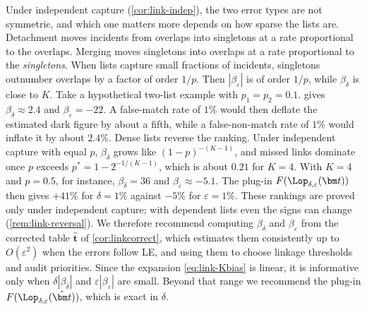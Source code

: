 \begin{remark}\label{rem:link-reading}
Under independent capture (\cref{cor:link-indep}), the two error types are not symmetric, and which one matters more depends on how sparse the lists are. Detachment moves incidents from overlaps into singletons at a rate proportional to the overlaps. Merging moves singletons into overlaps at a rate proportional to the \emph{singletons}. When lists capture small fractions of incidents, singletons outnumber overlaps by a factor of order $1/p$. Then $|\beta_\varepsilon|$ is of order $1/p$, while $\beta_\delta$ is close to $K$. Take a hypothetical two-list example with $p_1=p_2=0.1$.  gives $\beta_\delta\approx2.4$ and $\beta_\varepsilon=-22$. A false-match rate of $1\%$ would then deflate the estimated dark figure by about a fifth, while a false-non-match rate of $1\%$ would inflate it by about $2.4\%$. Dense lists reverse the ranking. Under independent capture with equal $p$, $\beta_\delta$ grows like $(1-p)^{-(K-1)}$, and missed links dominate once $p$ exceeds $p^\ast=1-2^{-1/(K-1)}$, which is about $0.21$ for $K=4$. With $K=4$ and $p=0.5$, for instance, $\beta_\delta=36$ and $\beta_\varepsilon\approx-5.1$. The plug-in $F(\Lop_{\delta,\varepsilon}(\bm t))$ then gives $+41\%$ for $\delta=1\%$ against $-5\%$ for $\varepsilon=1\%$. These rankings are proved only under independent capture; with dependent lists even the signs can change (\cref{rem:link-reversal}). We therefore recommend computing $\beta_\delta$ and $\beta_\varepsilon$ from the corrected table $\hat{\bm t}$ of \cref{cor:linkcorrect}, which estimates them consistently up to $O(\varepsilon^2)$ when the errors follow LE, and using them to choose linkage thresholds and audit priorities. Since the expansion \eqref{eq:link-Kbias} is linear, it is informative only when $\delta|\beta_\delta|$ and $\varepsilon|\beta_\varepsilon|$ are small. Beyond that range we recommend the plug-in $F(\Lop_{\delta,\varepsilon}(\hat{\bm t}))$, which is exact in $\delta$.
\end{remark}

